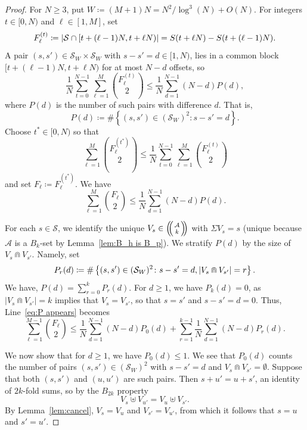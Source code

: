 \documentclass[10pt,letterpaper]{article}
\newcommand{\cA}{\mathcal{A}}
\newcommand{\cS}{\mathcal{S}}
\DeclarePairedDelimiter{\abs}{\lvert}{\rvert}
\newcommand{\multibinom}[2]{\left(\kern-0.3em\left(\genfrac{}{}{0pt}{}{#1}{#2}\right)\kern-0.3em\right)}
\theoremstyle{remark}
\begin{document}
\begin{proof}
For $N\ge 3$, put $W\coloneqq (M+1)N=N^2/\log^3(N)+O(N)$.  For integers
$t\in[0,N)$ and $\ell \in [1,M]$, set
  \[F_\ell^{(t)}\coloneqq \abs*{\cS \cap [t+(\ell-1)N, t+\ell N)}
  =S(t+\ell N)-S(t+(\ell-1)N).\]  
A pair $(s,s') \in \cS_W\times \cS_W$ with $s-s'=d \in[1, N)$, lies in a common block $[t+(\ell-1)N, t+\ell N)$ for at most $N-d$ offsets, so
\begin{equation}\label{eq:average}
   \frac1N\sum_{t=0}^{N-1}\sum_{\ell=1}^{M}\binom{F_\ell^{(t)}}{2}
    \le \frac1N\sum_{d=1}^{N-1}(N-d) P(d),
\end{equation}
where $P(d)$ is the number of such pairs with difference $d$.  
That is,
  \[P(d) \coloneqq \#\left\{ (s,s') \in (\cS_W)^2 \colon s-s'=d \right\}.\]
Choose $t^\ast\in[0,N)$ so that
  \[\sum_{\ell=1}^{M}\binom{F_\ell^{(t^\ast)}}{2} \le \frac1N\sum_{t=0}^{N-1}\sum_{\ell=1}^{M}\binom{F_\ell^{(t)}}{2}\]
and set $F_\ell \coloneqq F_\ell^{(t^\ast)}$. We have
  \begin{equation}\label{eq:P appears}
    \sum_{\ell=1}^{M}\binom{F_\ell}{2}
    \le \frac1N\sum_{d=1}^{N-1}(N-d) P(d).
  \end{equation}

For each $s\in \cS$, we identify the unique $V_s \in \multibinom{\cA}{k}$ with $\Sigma V_s =s $ (unique because $\cA$ is a $B_k$-set by Lemma~\ref{lem:B_h is B_p}). 
We stratify $P(d)$ by the size of $V_s \Cap V_{s'}$. Namely, set
  \[P_r(d) \coloneqq \#\left\{ (s,s')\in (\cS_W)^2 \colon s-s'=d ,\abs*{V_s \Cap V_{s'}}=r \right\}.\]
We have, $P(d) = \sum_{r=0}^k P_r(d)$. For $d\ge1$, we have $P_k(d)=0$, as $|V_s \Cap V_{s'}| =k$ implies that $V_s=V_{s'}$, so that $s=s'$ and $s-s'=d=0$. 
Thus, Line~\eqref{eq:P appears} becomes
  \begin{equation}\label{eq:P_r appears}
    \sum_{\ell=1}^{M-1}\binom{F_\ell}{2}
    \le \frac1N\sum_{d=1}^{N-1}(N-d) P_0(d)+ \sum_{r=1}^{k-1} \frac1N\sum_{d=1}^{N-1}(N-d) P_r(d).
  \end{equation}

We now show that for $d\ge 1$, we have $P_0(d)\le 1$. 
We see that $P_0(d)$ counts the number of pairs $(s,s')\in (\cS_W)^2$ with $s-s'=d$ and $V_s \Cap V_{s'}=\emptyset$.
Suppose that both $(s,s')$ and $(u,u')$ are such pairs. 
Then $s+u'=u+s'$, an identity of $2k$-fold sums, so by the $B_{2k}$ property
  \[V_s \uplus V_{u'} = V_{u} \uplus V_{s'}.\]
By Lemma~\ref{lem:cancel}, $V_s=V_u$ and $V_{s'}=V_{u'}$, from which it follows that $s=u$ and $s'=u'$. 


\end{proof}
\end{document}
